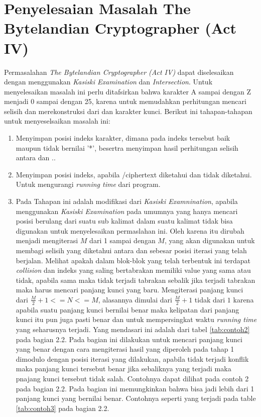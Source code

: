 	\section{Penyelesaian Masalah The Bytelandian Cryptographer (Act IV)}
	\label{chapter:solving}
	Permasalahan \textit{The Bytelandian Cryptographer (Act IV)} dapat diselesaikan dengan menggunakan \textit{Kasiski Examination} dan \textit{Intersection}. Untuk menyelesaikan masalah ini perlu ditafsirkan bahwa karakter A sampai dengan Z menjadi 0 sampai dengan 25, karena untuk memudahkan perhitungan mencari selisih dan merekonstruksi \plaintext dari \ciphertext dan karakter kunci. Berikut ini tahapan-tahapan untuk menyeselsaikan masalah ini:
	\begin{enumerate}
	\item Menyimpan posisi indeks karakter, dimana pada indeks tersebut baik \ciphertext maupun \plaintext tidak bernilai '*', besertra menyimpan hasil perhitungan selisih antara \ciphertext dan \plaintext.\cite{john_jones_spoj_2009}.
	\item Menyimpan posisi indeks, apabila /ciphertext diketahui dan \plaintext tidak diketahui. Untuk mengurangi \textit{running time} dari program\cite{john_jones_spoj_2009}.
	\item Pada Tahapan ini adalah modifikasi dari \textit{Kasiski Examnination}, apabila menggunakan \textit{Kasiski Examination} pada umumnya yang hanya mencari posisi berulang dari suatu sub kalimat dalam suatu kalimat tidak bisa digunakan untuk menyelesaikan permaslahan ini. Oleh karena itu dirubah menjadi mengiterasi $M$ dari 1 sampai dengan $M$, yang akan digunakan untuk membagi selisih yang diketahui antara \plaintext dan \ciphertext sebesar posisi iterasi yang telah berjalan. Melihat apakah dalam blok-blok yang telah terbentuk ini terdapat \textit{collision} dan indeks yang saling bertabrakan memiliki value yang sama atau tidak, apabila sama maka tidak terjadi tabrakan sebalik jika terjadi tabrakan maka harus mencari panjang kunci yang baru. Mengiterasi panjang kunci dari $\frac{M}{2}+1<=N<=M$, alasannya dimulai dari $\frac{M}{2}+1$ tidak dari $1$ karena apabila suatu panjang kunci bernilai benar maka kelipatan dari panjang kunci itu pun juga pasti benar dan untuk mempersingkat waktu \textit{running time} yang seharusnya terjadi. Yang mendasari ini adalah dari tabel  \ref{tab:contoh2} pada bagian 2.2. Pada bagian ini dilakukan untuk mencari panjang kunci yang benar dengan cara mengiterasi hasil yang diperoleh pada tahap 1 dimodulo dengan posisi iterasi yang dilakukan, apabila tidak terjadi konflik maka panjang kunci tersebut benar jika sebaliknya yang terjadi maka pnajang kunci tersebut tidak salah. Contohnya dapat dilihat pada contoh 2 pada bagian 2.2. Pada bagian ini memungkinkan bahwa bisa jadi lebih dari 1 panjang kunci yang bernilai benar. Contohnya seperti yang terjadi pada table \ref{tab:contoh3} pada bagian 2.2. 

\end{enumerate}
